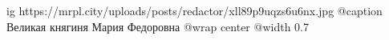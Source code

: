  
 
 
 
 

\ifcmt
  ig https://mrpl.city/uploads/posts/redactor/xll89p9uqzs6u6nx.jpg
	@caption Великая княгиня Мария Федоровна
  @wrap center
  @width 0.7
\fi
